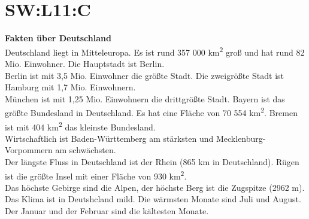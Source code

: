 \section{SW:L11:C}
\noindent
\textbf{Fakten über Deutschland}  \\
Deutschland liegt in Mitteleuropa.
Es ist rund 357 000 km\textsuperscript{2}  groß und hat rund 82 Mio. Einwohner. 
Die Hauptstadt ist Berlin. \\
Berlin ist mit 3,5 Mio. Einwohner die größte Stadt.
Die zweigrößte Stadt ist Hamburg mit 1,7 Mio. Einwohnern.  \\
München ist mit 1,25 Mio. Einwohnern die drittgrößte Stadt. 
Bayern ist das größte Bundesland in Deutschland. Es hat eine Fläche  von 70 554 km\textsuperscript{2}. Bremen ist mit 404 km\textsuperscript{2} das kleinste Bundesland. \\
Wirtschaftlich  ist Baden-Württemberg am stärksten und Mecklenburg-Vorpommern am schwächsten. \\
Der längste Fluss  in Deutschland ist der Rhein (865 km in Deutschland). Rügen ist die größte Insel  mit einer Fläche von 930 km\textsuperscript{2}. \\
Das höchste Gebirge sind die Alpen,  der höchste Berg ist die Zugspitze (2962 m). \\
Das Klima ist in Deutshcland mild.  Die wärmsten Monate sind Juli und August. Der Januar und der Februar sind die kältesten Monate.
\\
\\

